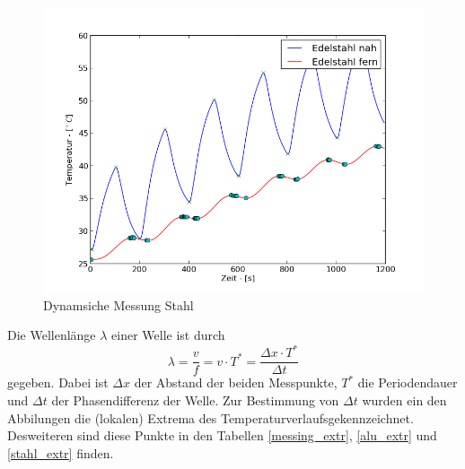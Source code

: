 \documentclass[11pt]{article}
\begin{document}
\begin{figure}[htp]
\centering
\includegraphics[width=\textwidth]{Diagramme/dyn_stahl.png}
\caption{Dynamsiche Messung Stahl}
\label{dyn_stahl}
\end{figure}\noindent
Die Wellenl\"ange $\lambda$ einer Welle ist durch
\begin{equation}
\lambda = \frac{v}{f} = v\cdot T^* = \frac{\Delta x\cdot  T^* }{\Delta t}
\end{equation}
gegeben. Dabei ist $\Delta x$ der Abstand der beiden Messpunkte, $T^*$ die Periodendauer und $\Delta t$ der Phasendifferenz der Welle. Zur Bestimmung von $\Delta t$ wurden ein den Abbilungen die (lokalen) Extrema des Temperaturverlaufsgekennzeichnet. Desweiteren sind diese Punkte in den Tabellen \ref{messing_extr}, \ref{alu_extr} und \ref{stahl_extr} finden.
\end{document}
